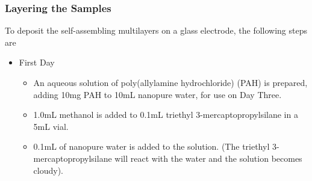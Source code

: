 \documentclass[12pt,oneside,english]{article}
\begin{document}
	\subsubsection{Layering the Samples}
	To deposit the self-assembling multilayers on a glass electrode, the following steps are 
	\begin{itemize}
		\item First Day
		\begin{itemize}
			\item An aqueous solution of poly(allylamine hydrochloride) (PAH) is prepared, adding 10mg PAH to 10mL nanopure water, for use on Day Three.
			\item 1.0mL methanol is added to 0.1mL triethyl 3-mercaptopropylsilane in a 5mL vial.
			\item 0.1mL of nanopure water is added to the solution.  (The triethyl 3-mercaptopropylsilane will react with the water and the solution becomes cloudy).
			

\end{itemize}
\end{itemize}
\end{document}
